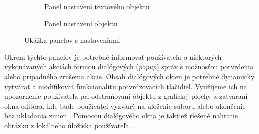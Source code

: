 \begin{figure}[H]
\begin{subfigure}[t]{0.3\linewidth}
		\label{obr:props-brush}
	\end{subfigure}
	\quad
	\begin{subfigure}[t]{0.48\linewidth}	
		\caption{Panel nastavení textového objektu}
		\label{obr:props-text}
	\end{subfigure}
	\quad
	\begin{subfigure}[t]{0.48\linewidth}	
		\caption{Panel nastavení objektu}
		\label{obr:props-object}
	\end{subfigure}
	\caption{Ukážka panelov s nastaveniami}
	\label{obr:props}
\end{figure}
	


Okrem týchto panelov je potrebné informovať používateľa o niektorých vykonávaných akciách formou dialógových (\textit{popup}) správ s možnosťou potvrdenia alebo prípadného zrušenia akcie. Obsah dialógových okien je potrebné dynamicky vytvárať a modifikovať funkcionalitu potvrdzovacích tlačidiel. Využijeme ich na upozornenie používateľa pri odstraňovaní objektu z grafickej plochy  a zatváraní okna editora, kde bude používateľ vyzvaný na uloženie súboru alebo ukončenie bez ukladania zmien . Pomocou dialógového okna je taktiež riešené nahratie obrázku z lokálneho úložiska používateľa .

